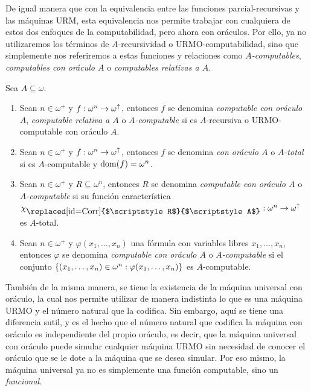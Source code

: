 \begin{agregado}
De igual manera que con la equivalencia entre las funciones parcial-recursivas y las máquinas URM, esta equivalencia nos permite trabajar con cualquiera de estos dos enfoques de la computabilidad, pero ahora con oráculos. Por ello, ya no utilizaremos los términos de $A$-recursividad o URMO-computabilidad, sino que simplemente nos referiremos a estas funciones y relaciones como \emph{$A$-computables}, \emph{computables con oráculo $A$} o \emph{computables relativas a $A$}.

\begin{definition}
	\label{def: computabilidad_relativa}
	Sea $A\subseteq\omega$.
	\begin{enumerate}
		\item Sean $n\in\omega^{+}$ y $f:\omega^{n}\to\omega^{\uparrow}$, entonces $f$ se denomina \emph{computable con oráculo $A$}, \emph{computable relativa a $A$} o \emph{$A$-computable} si es $A$-recursiva o URMO-computable con oráculo $A$.
		\item Sean $n\in\omega^{+}$ y $f:\omega^{n}\to\omega^{\uparrow}$, entonces $f$ se denomina \emph{ con oráculo $A$} o \emph{$A$-total} si es $A$-computable y $\DOMINIO{f} =\omega^{n}$.
		\item Sean $n\in\omega^{+}$ y $R\subseteq\omega^{n}$, entonces $R$ se denomina \emph{computable con oráculo $A$} o \emph{$A$-computable} si su función característica $\CARACTERISTICA{\mbox{\replaced[id=Corr]{$\scriptstyle R$}{$\scriptstyle A$}}}:\omega^{n}\to\omega^{\DIVERGE}$ es $A$-total.
		\item Sean $n\in\omega^{+}$ y $\varphi(x_{1},\dotsc, x_{n})$ una fórmula con variables libres $x_{1},\dotsc, x_{n}$, entonces $\varphi$ se denomina \emph{computable con oráculo $A$} o \emph{$A$-computable} si el conjunto $\set*{\pa*{x_{1},\dotsc, x_{n}}\in\omega^{n}:\varphi\pa*{x_{1},\dotsc, x_{n}}}$ es $A$-computable.
	\end{enumerate}
\end{definition}

También de la misma manera, se tiene la existencia de la máquina universal con oráculo, la cual nos permite utilizar de manera indistinta lo que es una máquina URMO y el número natural que la codifica. Sin embargo, aquí se tiene una diferencia sutil, y es el hecho que el número natural que codifica la máquina con oráculo es independiente del propio oráculo, es decir, que la máquina universal con oráculo puede simular cualquier máquina URMO sin necesidad de conocer el oráculo que se le dote a la máquina que se desea simular. Por eso mismo, la máquina universal ya no es simplemente una función computable, sino un \emph{funcional}.


\end{agregado}

